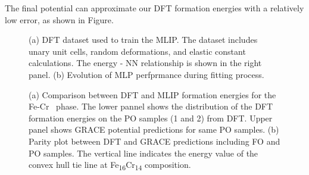 \documentclass[superscriptaddress, 12pt]{revtex4-2}%
\newcommand{\MFnew}[1]{{\color{purple} #1}}
\begin{document}
The final potential can approximate our DFT formation energies with a relatively low error, as shown in \MFnew{Figure}.

\begin{figure}[H]
  \caption{
    \protect\label{fig:DFTDataset}
    (a) DFT dataset used to train the MLIP. 
    The dataset includes unary unit cells, random deformations, and elastic constant calculations. 
    The energy - NN relationship is shown in the right panel.
    (b) Evolution of MLP perfprmance during fitting process.
}
\end{figure}

\begin{figure}



  \caption{\protect\label{fig:MLIPPrediction}
    (a) Comparison between DFT and MLIP formation energies for the Fe-Cr \textsigma~phase. 
    The lower pannel shows the distribution of the DFT formation energies on the PO samples (1 and 2) from DFT.
    Upper panel shows GRACE potential predictions for same PO samples. 
    (b) Parity plot between DFT and GRACE predictions including FO and PO samples. 
    The vertical line indicates the energy value of the convex hull tie line at Fe\textsubscript{16}Cr\textsubscript{14} composition.
	}

\end{figure}
\end{document}

